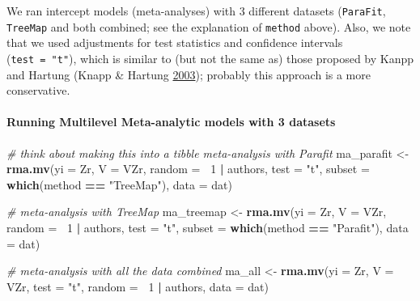 \documentclass[
]{article}
\newenvironment{Shaded}{\begin{snugshade}}{\end{snugshade}}
\newcommand{\CommentTok}[1]{\textcolor[rgb]{0.56,0.35,0.01}{\textit{#1}}}
\newcommand{\DataTypeTok}[1]{\textcolor[rgb]{0.13,0.29,0.53}{#1}}
\newcommand{\DecValTok}[1]{\textcolor[rgb]{0.00,0.00,0.81}{#1}}
\newcommand{\KeywordTok}[1]{\textcolor[rgb]{0.13,0.29,0.53}{\textbf{#1}}}
\newcommand{\NormalTok}[1]{#1}
\newcommand{\OperatorTok}[1]{\textcolor[rgb]{0.81,0.36,0.00}{\textbf{#1}}}
\newcommand{\StringTok}[1]{\textcolor[rgb]{0.31,0.60,0.02}{#1}}
\begin{document}
We ran intercept models (meta-analyses) with 3 different datasets
(\texttt{ParaFit}, \texttt{TreeMap} and both combined; see the
explanation of \texttt{method} above). Also, we note that we used
adjustments for test statistics and confidence intervals
(\texttt{test\ =\ "t"}), which is similar to (but not the same as) those
proposed by Kanpp and Hartung (Knapp \& Hartung
\protect\hyperlink{ref-knapp2003improved}{2003}); probably this approach
is a more conservative.

\hypertarget{running-multilevel-meta-analytic-models-with-3-datasets}{%
\paragraph{Running Multilevel Meta-analytic models with 3
datasets}\label{running-multilevel-meta-analytic-models-with-3-datasets}}

\begin{Shaded}
\begin{Highlighting}[]
\CommentTok{# think about making this into a tibble meta-analysis with Parafit}
\NormalTok{ma_parafit <-}\StringTok{ }\KeywordTok{rma.mv}\NormalTok{(}\DataTypeTok{yi =}\NormalTok{ Zr, }\DataTypeTok{V =}\NormalTok{ VZr, }\DataTypeTok{random =} \OperatorTok{~}\DecValTok{1} \OperatorTok{|}\StringTok{ }\NormalTok{authors, }\DataTypeTok{test =} \StringTok{"t"}\NormalTok{, }\DataTypeTok{subset =} \KeywordTok{which}\NormalTok{(method }\OperatorTok{==}\StringTok{ }
\StringTok{    "TreeMap"}\NormalTok{), }\DataTypeTok{data =}\NormalTok{ dat)}

\CommentTok{# meta-analysis with TreeMap}
\NormalTok{ma_treemap <-}\StringTok{ }\KeywordTok{rma.mv}\NormalTok{(}\DataTypeTok{yi =}\NormalTok{ Zr, }\DataTypeTok{V =}\NormalTok{ VZr, }\DataTypeTok{random =} \OperatorTok{~}\DecValTok{1} \OperatorTok{|}\StringTok{ }\NormalTok{authors, }\DataTypeTok{test =} \StringTok{"t"}\NormalTok{, }\DataTypeTok{subset =} \KeywordTok{which}\NormalTok{(method }\OperatorTok{==}\StringTok{ }
\StringTok{    "Parafit"}\NormalTok{), }\DataTypeTok{data =}\NormalTok{ dat)}

\CommentTok{# meta-analysis with all the data combined}
\NormalTok{ma_all <-}\StringTok{ }\KeywordTok{rma.mv}\NormalTok{(}\DataTypeTok{yi =}\NormalTok{ Zr, }\DataTypeTok{V =}\NormalTok{ VZr, }\DataTypeTok{test =} \StringTok{"t"}\NormalTok{, }\DataTypeTok{random =} \OperatorTok{~}\DecValTok{1} \OperatorTok{|}\StringTok{ }\NormalTok{authors, }\DataTypeTok{data =}\NormalTok{ dat)}
\end{Highlighting}
\end{Shaded}
\end{document}
